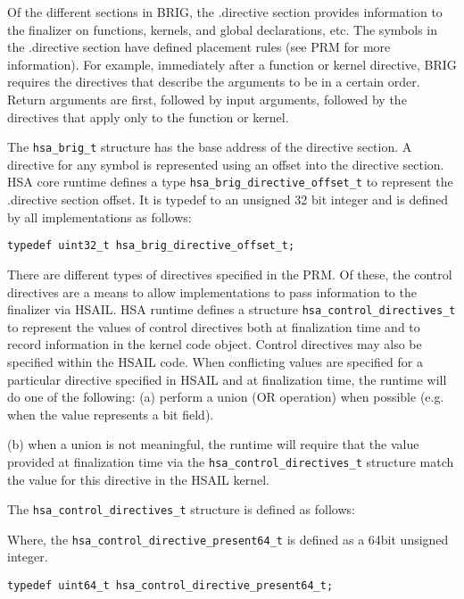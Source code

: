 

Of the different sections in BRIG, the .directive section provides
information to the finalizer on functions, kernels, and global
declarations, etc. The symbols in the .directive section have defined
placement rules (see PRM for more information). For example,
immediately after a function or kernel directive, BRIG requires the
directives that describe the arguments to be in a certain order.
Return arguments are first, followed by input arguments, followed by
the directives that apply only to the function or kernel.

The \texttt{hsa\_brig\_t} structure has the base address of the
directive section. A directive for any symbol is represented using
an offset into the directive section. HSA core runtime defines a
type \texttt{hsa\_brig\_directive\_offset\_t} to represent the
.directive section offset. It is typedef to an unsigned 32 bit
integer and is defined by all implementations as follows:

\begin{lstlisting}
typedef uint32_t hsa_brig_directive_offset_t;
\end{lstlisting}

There are different types of directives specified in the PRM. Of
these, the control directives are a means to allow implementations
to pass information to the finalizer via HSAIL. HSA runtime
defines a structure \texttt{hsa\_control\_directives\_t} to
represent the values of control directives both at finalization
time and to record information in the kernel code object. Control
directives may also be specified within the HSAIL code. When
conflicting values are specified for a particular directive
specified in HSAIL and at finalization time, the runtime will do one
of the following: (a) perform a union (OR operation) when possible
(e.g. when the value represents a bit field).

(b) when a union is not meaningful, the runtime will require that the value provided at
finalization time via the \texttt{hsa\_control\_directives\_t}
structure match the value for this directive in the HSAIL kernel.

The \texttt{hsa\_control\_directives\_t} structure is defined as
follows:



Where, the \texttt{hsa\_control\_directive\_present64\_t} is defined
as a 64bit unsigned integer.

\begin{lstlisting}
typedef uint64_t hsa_control_directive_present64_t;
\end{lstlisting}

